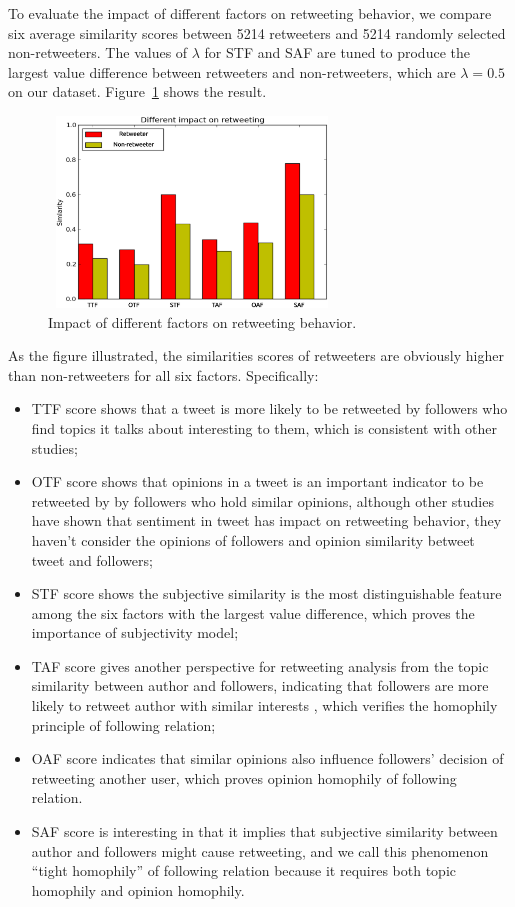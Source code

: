 \documentclass[twocolumn]{svjour3}          %
\begin{document}
To evaluate the impact of different factors on retweeting behavior, we compare six average similarity scores between 5214 retweeters and 5214 randomly selected non-retweeters. The values of $ \lambda $ for STF and SAF are tuned to produce the largest value difference between retweeters and non-retweeters, which are $ \lambda =0.5 $ on our dataset. Figure~\ref{fig3} shows the result.
\begin{figure}[htb]
\centering
\includegraphics[width=3.0in,height=2.0in]{fig3.eps}
\caption{Impact of different factors on retweeting behavior.}
\label{fig3}
\end{figure}
As the figure illustrated, the similarities scores of retweeters are obviously higher than non-retweeters for all six factors. Specifically: 
\begin{itemize}
\item TTF score shows that a tweet is more likely to be retweeted by followers who find topics it talks about interesting to them, which is consistent with other studies\cite{conf/icwsm/MacskassyM11};
\item OTF score shows that opinions in a tweet is an important indicator to be retweeted by by followers who hold similar opinions, although other studies\cite{conf/icwsm/PfitznerGS12,2011:NaveedGKC} have shown that sentiment in tweet has impact on retweeting behavior, they haven't consider the opinions of followers and opinion similarity betweet tweet and followers;
\item STF score shows the subjective similarity is the most distinguishable feature among the six factors with the largest value difference, which proves the importance of subjectivity model;
\item TAF score gives another perspective for retweeting analysis from the topic similarity between author and followers, indicating that followers are more likely to retweet author with similar interests , which verifies the homophily principle of following relation;
\item OAF score indicates that similar opinions also influence followers' decision of retweeting another user, which proves opinion homophily of following relation.
\item SAF score is interesting in that it implies that subjective similarity between author and followers might cause retweeting, and we call this phenomenon ``tight homophily'' of following relation because it requires both topic homophily and opinion homophily.
\end{itemize} 
\end{document}
